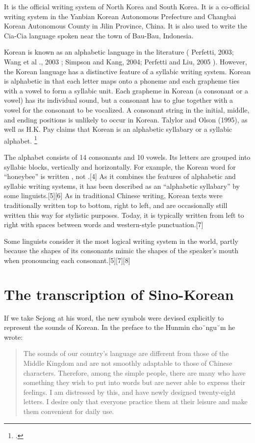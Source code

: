 It is the official writing system of North Korea and South Korea. It is a co-official writing system in the Yanbian Korean Autonomous Prefecture and Changbai Korean Autonomous County in Jilin Province, China. It is also used to write the Cia-Cia language spoken near the town of Bau-Bau, Indonesia.

Korean is known as an alphabetic language in the literature ( Perfetti, 2003;
 Wang et al ., 2003 ; Simpson and Kang, 2004;
 Perfetti and Liu, 2005 ). However, the Korean language has a distinctive feature of a syllabic writing
system. Korean is alphabetic in that each letter maps onto a phoneme and each grapheme ties with
a vowel to form a syllabic unit. Each grapheme in Korean (a consonant or a vowel) has its individual
sound, but a consonant has to glue together with a vowel for the consonant to be vocalized. A consonant
string in the initial, middle, and ending positions is unlikely to occur in Korean. Talylor and Olson (1995), as well as H.K. Pay claims that Korean is an alphabetic syllabary or a syllabic alphabet. \footcite{perfetti2003}


The alphabet consists of 14 consonants and 10 vowels. Its letters are grouped into syllabic blocks, vertically and horizontally. For example, the Korean word for \enquote{honeybee} is written , not .[4] As it combines the features of alphabetic and syllabic writing systems, it has been described as an \enquote{alphabetic syllabary} by some linguists.[5][6] As in traditional Chinese writing, Korean texts were traditionally written top to bottom, right to left, and are occasionally still written this way for stylistic purposes. Today, it is typically written from left to right with spaces between words and western-style punctuation.[7]

Some linguists consider it the most logical writing system in the world, partly because the shapes of its consonants mimic the shapes of the speaker's mouth when pronouncing each consonant.[5][7][8]

\section{The transcription of Sino-Korean}

If we take Sejong at his word, the new symbols were devised explicitly to
represent the sounds of Korean. In the preface to the Hunmin cho˘ngu˘m he
wrote:

\begin{quotation}
The sounds of our country’s language are different from those of the Middle Kingdom
and are not smoothly adaptable to those of Chinese characters. Therefore, among the
simple people, there are many who have something they wish to put into words but are
never able to express their feelings. I am distressed by this, and have newly designed
twenty-eight letters. I desire only that everyone practice them at their leisure and make
them convenient for daily use.
\end{quotation}

